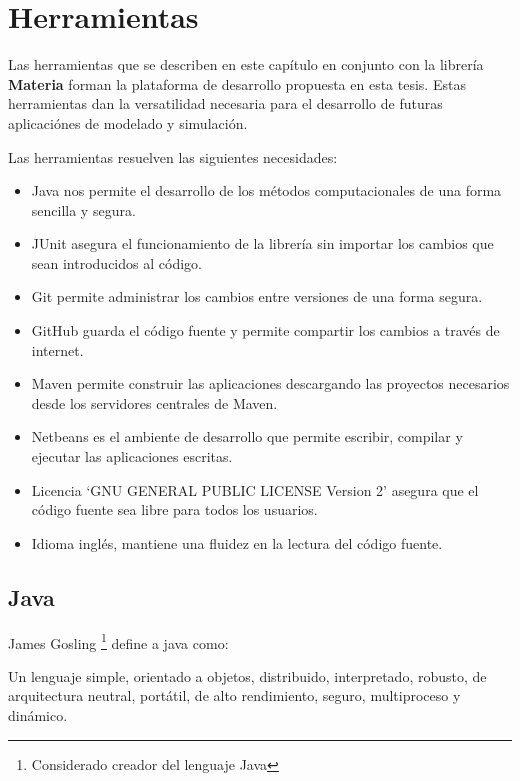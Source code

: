 \chapter{Herramientas}\label{chap:tools}

	Las herramientas que se describen en este capítulo en conjunto con la librería \textbf{Materia} forman la plataforma de desarrollo propuesta en esta tesis. Estas herramientas dan la versatilidad necesaria para el desarrollo de futuras aplicaciónes de modelado y simulación. 

	Las herramientas resuelven las siguientes necesidades:

\begin{itemize}
	\item Java nos permite el desarrollo de los métodos computacionales de una forma sencilla y segura.
	\item JUnit asegura el funcionamiento de la librería sin importar los cambios que sean introducidos al código.
	\item Git permite administrar los cambios entre versiones de una forma segura.
	\item GitHub guarda el código fuente y permite compartir los cambios a través de internet.
	\item Maven permite construir las aplicaciones descargando las proyectos necesarios desde los servidores centrales de Maven.
	\item Netbeans es el ambiente de desarrollo que permite escribir, compilar y ejecutar las aplicaciones escritas.
	\item Licencia `GNU GENERAL PUBLIC LICENSE Version 2' asegura que el código fuente sea libre para todos los usuarios.%
	\item Idioma inglés, mantiene una fluidez en la lectura del código fuente.
\end{itemize}

	\section{Java}

		James Gosling \footnote{Considerado creador del lenguaje Java} define a java como: 

		Un lenguaje simple, orientado a objetos, distribuido, interpretado, robusto, de arquitectura neutral, portátil, de alto rendimiento, seguro, multiproceso y dinámico.\cite{java}

		

